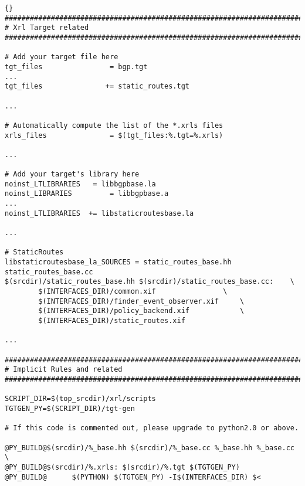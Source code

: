 \documentclass[11pt]{article}
\newcommand{\stt}{\tt\small}
\begin{document}
\begin{lstlisting}[caption={Extracts from {\stt xorp/xrl/targets/Makefile.am} %
                                     \label{lst:tgt.makefile} } ]{}
###############################################################################
# Xrl Target related
###############################################################################

# Add your target file here
tgt_files                = bgp.tgt
...
tgt_files               += static_routes.tgt

...

# Automatically compute the list of the *.xrls files
xrls_files               = $(tgt_files:%.tgt=%.xrls)

...

# Add your target's library here
noinst_LTLIBRARIES	 = libbgpbase.la
noinst_LIBRARIES         = libbgpbase.a
...
noinst_LTLIBRARIES	+= libstaticroutesbase.la

...

# StaticRoutes
libstaticroutesbase_la_SOURCES = static_routes_base.hh static_routes_base.cc
$(srcdir)/static_routes_base.hh $(srcdir)/static_routes_base.cc:	\
		$(INTERFACES_DIR)/common.xif 				\
		$(INTERFACES_DIR)/finder_event_observer.xif		\
		$(INTERFACES_DIR)/policy_backend.xif			\
		$(INTERFACES_DIR)/static_routes.xif

...

###############################################################################
# Implicit Rules and related
###############################################################################

SCRIPT_DIR=$(top_srcdir)/xrl/scripts
TGTGEN_PY=$(SCRIPT_DIR)/tgt-gen

# If this code is commented out, please upgrade to python2.0 or above.

@PY_BUILD@$(srcdir)/%_base.hh $(srcdir)/%_base.cc %_base.hh %_base.cc   \
@PY_BUILD@$(srcdir)/%.xrls: $(srcdir)/%.tgt $(TGTGEN_PY)
@PY_BUILD@      $(PYTHON) $(TGTGEN_PY) -I$(INTERFACES_DIR) $<
\end{lstlisting}
\end{document}
